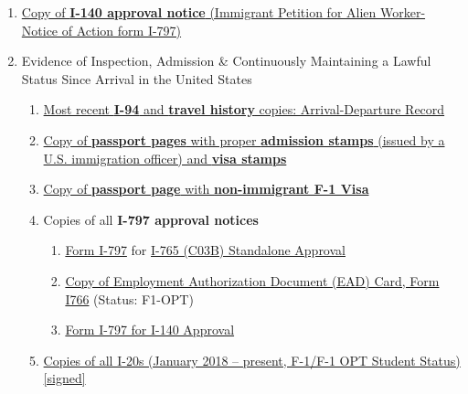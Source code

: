 \begin{enumerate}[label=\textbf{ Exhibit-\arabic*}]
    \item \hyperref[exhibit1]{Copy of \textbf{ I-140 approval notice} (Immigrant Petition for Alien Worker- Notice of Action form I-797)}
    

    \item Evidence of Inspection, Admission \& Continuously Maintaining a Lawful Status Since Arrival in the United States
    \begin{enumerate}[label=\roman*.]
        \item \hyperref[exhibit6c]{Most recent \textbf{I-94} and \textbf{travel history} copies: Arrival-Departure Record}
        \item \hyperref[exhibit6a]{Copy of \textbf{passport pages} with proper \textbf{admission stamps} (issued by a U.S. immigration officer) and \textbf{visa stamps} }
        \item \hyperref[exhibit6b]{Copy of \textbf{passport page} with \textbf{non-immigrant F-1 Visa}}
        
        \item Copies of all \textbf{I-797 approval notices} \begin{enumerate}[label=\alph*.]
            \item \hyperref[exhibit6d]{Form I-797} for \hyperref[exhibit8e]{I-765 (C03B) Standalone Approval}
            \item \hyperref[exhibit6da3]{Copy of Employment Authorization Document (EAD) Card, Form I766} (Status: F1-OPT)
            \item \hyperref[exhibit1]{Form I-797 for I-140 Approval}
        \end{enumerate}
        
    \item \hyperref[exhibit6e]{Copies of all I-20s (January 2018 – present, F-1/F-1 OPT Student Status) [signed]}
    
    \end{enumerate}


\end{enumerate}
